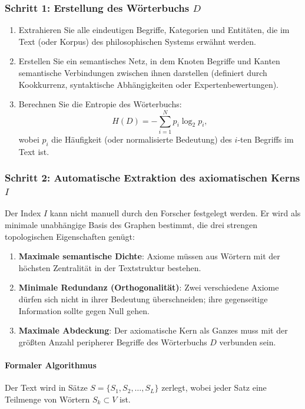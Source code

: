 \documentclass[12pt,a4paper]{article}
\begin{document}
	\subsubsection{Schritt 1: Erstellung des Wörterbuchs \(D\)}
	
	\begin{enumerate}
		\item Extrahieren Sie alle eindeutigen Begriffe, Kategorien und Entitäten, die im Text (oder Korpus) des philosophischen Systems erwähnt werden.
		\item Erstellen Sie ein semantisches Netz, in dem Knoten Begriffe und Kanten semantische Verbindungen zwischen ihnen darstellen (definiert durch Kookkurrenz, syntaktische Abhängigkeiten oder Expertenbewertungen).
		\item Berechnen Sie die Entropie des Wörterbuchs:
		\[
		H(D) = -\sum_{i=1}^{N} p_i \log_2 p_i,
		\]
		wobei \(p_i\) die Häufigkeit (oder normalisierte Bedeutung) des \(i\)-ten Begriffs im Text ist.
	\end{enumerate}
	
	\subsubsection{Schritt 2: Automatische Extraktion des axiomatischen Kerns \(I\)}
	\label{sec:auto-basis}
	
	Der Index \(I\) kann nicht manuell durch den Forscher festgelegt werden. Er wird als minimale unabhängige Basis des Graphen bestimmt, die drei strengen topologischen Eigenschaften genügt:
	\begin{enumerate}
		\item \textbf{Maximale semantische Dichte}: Axiome müssen aus Wörtern mit der höchsten Zentralität in der Textstruktur bestehen.
		\item \textbf{Minimale Redundanz (Orthogonalität)}: Zwei verschiedene Axiome dürfen sich nicht in ihrer Bedeutung überschneiden; ihre gegenseitige Information sollte gegen Null gehen.
		\item \textbf{Maximale Abdeckung}: Der axiomatische Kern als Ganzes muss mit der größten Anzahl peripherer Begriffe des Wörterbuchs \(D\) verbunden sein.
	\end{enumerate}
	
	\paragraph{Formaler Algorithmus}
	Der Text wird in Sätze \(S = \{S_1, S_2, \dots, S_L\}\) zerlegt, wobei jeder Satz eine Teilmenge von Wörtern \(S_k \subset V\) ist.
	
\end{document}
